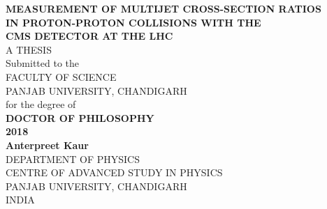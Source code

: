 {
\pagestyle{empty}
\begin{center}
\renewcommand{\rmdefault}{phv} %
{\fontsize{14}{16}\sf \bf MEASUREMENT OF MULTIJET CROSS-SECTION RATIOS \\IN PROTON-PROTON COLLISIONS WITH THE \\CMS DETECTOR AT THE LHC}
\\ [3.8cm]

{\fontsize{12}{14} \sf A THESIS} \\
\vspace{0.3cm}
{ \sf Submitted to the \\
{\fontsize{12}{14} FACULTY OF SCIENCE \\
PANJAB UNIVERSITY, CHANDIGARH \\ }
for the degree of }\\
\vspace{0.5cm}
{\fontsize{14}{16}  \bf DOCTOR OF PHILOSOPHY}\\ [2.0cm]
{\fontsize{14}{16} \sf \textbf{2018}} \\[2.0cm]
{\fontsize{14}{16} \bf Anterpreet Kaur}\\[1.25cm]
{\fontsize{12}{14} \sf DEPARTMENT OF PHYSICS \\
CENTRE OF ADVANCED STUDY IN PHYSICS\\
PANJAB UNIVERSITY, CHANDIGARH\\
INDIA}
\end{center}

}
